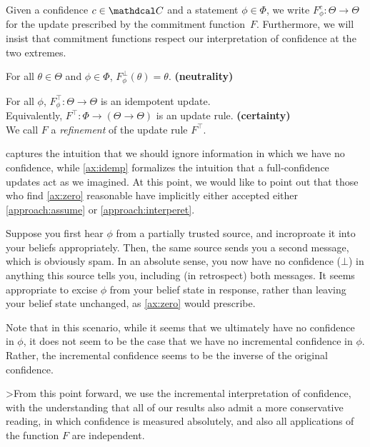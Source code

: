 \documentclass{uai2023}
\theoremstyle{plain}
\theoremstyle{definition}
\newcommand\cofunc{commitment function}
\newcommand\confdom{\mathdcal C}
\begin{document}
Given a confidence $c \in \confdom$ and a statement $\phi \in \Phi$, we write
$F^c_\phi : \Theta \to \Theta$
for the update prescribed by the \cofunc\ $F$.
Furthermore, we will insist that \cofunc s respect our interpretation of confidence at the two extremes.
\begin{CFaxioms}
\item
For all $\theta \in \Theta$ and $\phi \in \Phi$, $F^{\bot}_\phi(\theta) = \theta$.
\hfill \textbf{(neutrality)} \label{ax:zero}
\item
For all $\phi$,
$F^\top_\phi : \Theta \to \Theta$
		is an idempotent update.\\
		Equivalently, $F^\top: \Phi \to (\Theta \to \Theta)$ is an update rule.
\hfill \textbf{(certainty)} \label{ax:idemp}\\
		We call $F$ a \emph{refinement} of the update rule $F^\top$.
\end{CFaxioms}
 captures the intuition that we should ignore information in which we have no confidence, while \cref{ax:idemp} formalizes the intuition that a full-confidence updates act as we imagined.
At this point, we would like to point out that those who find \cref{ax:zero} reasonable have implicitly either accepted either \cref{approach:assume} or \cref{approach:interperet}.

\begin{example}
	Suppose you first hear $\phi$ from a partially trusted source, and incroproate it into your beliefs appropriately.
	Then, the same source sends you a second message, which is obviously spam.
	In an absolute sense, you now have no confidence ($\bot$) in anything this source tells you, including (in retrospect) both messages.
	It seems appropriate to excise $\phi$ from your belief state in response, rather than leaving your belief state unchanged, as \cref{ax:zero} would prescribe.

	Note that in this scenario, while it seems that we ultimately have no confidence in $\phi$, it does not seem to be the case that we have no incremental confidence in $\phi$.
	Rather, the incremental confidence seems to be the inverse of the original confidence.
\end{example}

>From this point forward, we use the incremental interpretation of confidence, with the understanding that
all of our results also admit a more conservative reading, in which confidence is measured absolutely, and also all applications of the function $F$ are independent. 
\end{document}
